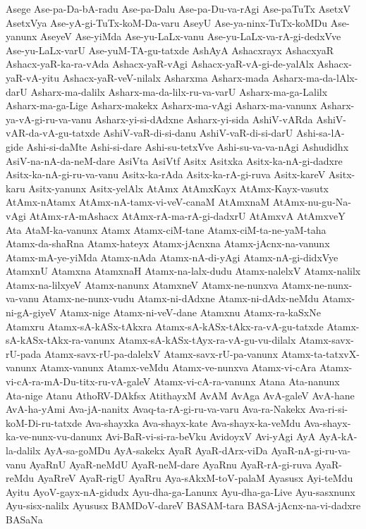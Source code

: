 {Asege
Ase-pa-Da-bA-radu
Ase-pa-Dalu
Ase-pa-Du-va-rAgi
Ase-paTuTx
AsetxV
AsetxVya
Ase-yA-gi-TuTx-koM-Da-varu
AseyU
Ase-ya-ninx-TuTx-koMDu
Ase-yanunx
AseyeV
Ase-yiMda
Ase-yu-LaLx-vanu
Ase-yu-LaLx-va-rA-gi-dedxVve
Ase-yu-LaLx-varU
Ase-yuM-TA-gu-tatxde
AshAyA
Ashacxrayx
AshacxyaR
Ashacx-yaR-ka-ra-vAda
Ashacx-yaR-vAgi
Ashacx-yaR-vA-gi-de-yalAlx
Ashacx-yaR-vA-yitu
Ashacx-yaR-veV-nilalx
Asharxma
Asharx-mada
Asharx-ma-da-lAlx-darU
Asharx-ma-dalilx
Asharx-ma-da-lilx-ru-va-varU
Asharx-ma-ga-Lalilx
Asharx-ma-ga-Lige
Asharx-makekx
Asharx-ma-vAgi
Asharx-ma-vanunx
Asharx-ya-vA-gi-ru-va-vanu
Asharx-yi-si-dAdxne
Asharx-yi-sida
AshiV-vARda
AshiV-vAR-da-vA-gu-tatxde
AshiV-vaR-di-si-danu
AshiV-vaR-di-si-darU
Ashi-sa-lA-gide
Ashi-si-daMte
Ashi-si-dare
Ashi-su-tetxVve
Ashi-su-va-va-nAgi
Ashudidhx
AsiV-na-nA-da-neM-dare
AsiVta
AsiVtf
Asitx
Asitxka
Asitx-ka-nA-gi-dadxre
Asitx-ka-nA-gi-ru-va-vanu
Asitx-ka-rAda
Asitx-ka-rA-gi-ruva
Asitx-kareV
Asitx-karu
Asitx-yanunx
Asitx-yelAlx
AtAmx
AtAmxKayx
AtAmx-Kayx-vasutx
AtAmx-nAtamx
AtAmx-nA-tamx-vi-veV-canaM
AtAmxnaM
AtAmx-nu-gu-Na-vAgi
AtAmx-rA-mAshacx
AtAmx-rA-ma-rA-gi-dadxrU
AtAmxvA
AtAmxveY
Ata
AtaM-ka-vanunx
Atamx
Atamx-ciM-tane
Atamx-ciM-ta-ne-yaM-taha
Atamx-da-shaRna
Atamx-hateyx
Atamx-jAcnxna
Atamx-jAcnx-na-vanunx
Atamx-mA-ye-yiMda
Atamx-nAda
Atamx-nA-di-yAgi
Atamx-nA-gi-didxVye
AtamxnU
Atamxna
AtamxnaH
Atamx-na-lalx-dudu
Atamx-nalelxV
Atamx-nalilx
Atamx-na-lilxyeV
Atamx-nanunx
AtamxneV
Atamx-ne-nunxva
Atamx-ne-nunx-va-vanu
Atamx-ne-nunx-vudu
Atamx-ni-dAdxne
Atamx-ni-dAdx-neMdu
Atamx-ni-gA-giyeV
Atamx-nige
Atamx-ni-veV-dane
Atamxnu
Atamx-ra-kaSxNe
Atamxru
Atamx-sA-kASx-tAkxra
Atamx-sA-kASx-tAkx-ra-vA-gu-tatxde
Atamx-sA-kASx-tAkx-ra-vanunx
Atamx-sA-kASx-tAyx-ra-vA-gu-vu-dilalx
Atamx-savx-rU-pada
Atamx-savx-rU-pa-dalelxV
Atamx-savx-rU-pa-vanunx
Atamx-ta-tatxvX-vanunx
Atamx-vanunx
Atamx-veMdu
Atamx-ve-nunxva
Atamx-vi-cAra
Atamx-vi-cA-ra-mA-Du-titx-ru-vA-galeV
Atamx-vi-cA-ra-vanunx
Atana
Ata-nanunx
Ata-nige
Atanu
AthoRV-DAkfsx
AtithayxM
AvAM
AvAga
AvA-galeV
AvA-hane
AvA-ha-yAmi
Ava-jA-nanitx
Avaq-ta-rA-gi-ru-va-varu
Ava-ra-Nakekx
Ava-ri-si-koM-Di-ru-tatxde
Ava-shayxka
Ava-shayx-kate
Ava-shayx-ka-veMdu
Ava-shayx-ka-ve-nunx-vu-danunx
Avi-BaR-vi-si-ra-beVku
AvidoyxV
Avi-yAgi
AyA
AyA-kA-la-dalilx
AyA-sa-goMDu
AyA-sakekx
AyaR
AyaR-dArx-viDa
AyaR-nA-gi-ru-va-vanu
AyaRnU
AyaR-neMdU
AyaR-neM-dare
AyaRnu
AyaR-rA-gi-ruva
AyaR-reMdu
AyaRreV
AyaR-rigU
AyaRru
Aya-sAkxM-toV-palaM
Ayasusx
Ayi-teMdu
Ayitu
AyoV-gayx-nA-gidudx
Ayu-dha-ga-Lanunx
Ayu-dha-ga-Live
Ayu-sasxnunx
Ayu-sisx-nalilx
Ayususx
BAMDoV-dareV
BASAM-tara
BASA-jAcnx-na-vi-dadxre
BASaNa
}
